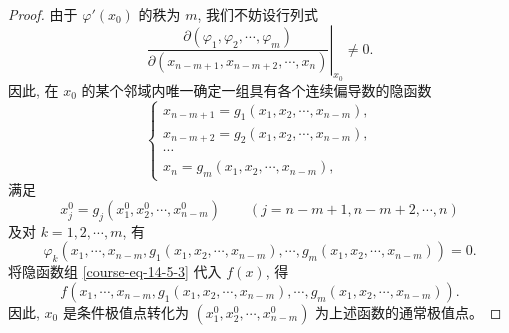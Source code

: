 \documentclass[UTF8,12pt,a4paper,fontset=fandol]{ctexart}
\begin{document}
\begin{proof}\quad 由于 $\varphi'(x_0)$ 的秩为 $m$, 我们不妨设行列式
\[
  \left.
  \frac{\partial(\varphi_1,\varphi_2,\cdots,\varphi_m)}
       {\partial(x_{n-m+1},x_{n-m+2},\cdots,x_n)}
  \right|_{x_0}
  \ne0.
\]
因此, 在 $x_0$ 的某个邻域内唯一确定一组具有各个连续偏导数的隐函数
\begin{equation}
  \begin{cases}
    x_{n-m+1}=g_1(x_1,x_2,\cdots,x_{n-m}),\\
    x_{n-m+2}=g_2(x_1,x_2,\cdots,x_{n-m}),\\
    \cdots\\
    x_n=g_m(x_1,x_2,\cdots,x_{n-m}),
  \end{cases}
  \label{course-eq-14-5-3}
\end{equation}
满足
\[
  x_j^0=g_j(x_1^0,x_2^0,\cdots,x_{n-m}^0)
  \qquad (j=n-m+1,n-m+2,\cdots,n)
\]
及对 $k=1,2,\cdots,m$, 有
\[
  \varphi_k(x_1,\cdots,x_{n-m},g_1(x_1,x_2,\cdots,x_{n-m}),\cdots,g_m(x_1,x_2,\cdots,x_{n-m}))=0.
\]
将隐函数组 \eqref{course-eq-14-5-3}  代入 $f(x)$, 得
\[
  f(x_1,\cdots,x_{n-m},g_1(x_1,x_2,\cdots,x_{n-m}),\cdots,g_m(x_1,x_2,\cdots,x_{n-m})).
\]
因此, $x_0$ 是条件极值点转化为 $(x_1^0,x_2^0,\cdots,x_{n-m}^0)$ 为上述函数的通常极值点。


\end{proof}
\end{document}
